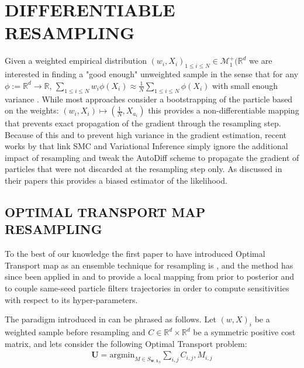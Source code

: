 \documentclass[]{article}
\begin{document}
\section{DIFFERENTIABLE RESAMPLING}
\label{sec:differentiable}
	Given a weighted empirical distribution $(w_i, X_i)_{1 \leq i \leq N} \in \mathcal{M}^+_1(\mathbb{R}^d$ we are interested in finding a "good enough" unweighted sample in the sense that for any $\phi := \mathbb{R}^d \to \mathbb{R}$, $\sum_{1 \leq i \leq N} w_i \phi(X_i) \approx \frac{1}{N}\sum_{1 \leq i \leq N} \phi(X_i)$ with small enough variance \parencite[][]{resampling_comp}. While most approaches consider a bootstrapping of the particle based on the weights: $(w_i, X_i) \mapsto (\frac 1 N, X_{a_i})$ this provides a non-differentiable mapping that prevents exact propagation of the gradient through the resampling step. Because of this and to prevent high variance in the gradient estimation, recent works by \cite{maddison2017filtering,naesseth2017variational,le2017auto} that link SMC and Variational Inference simply ignore the additional impact of resampling and tweak the AutoDiff scheme to propagate the gradient of particles that were not discarded at the resampling step only. As discussed in their papers this provides a biased estimator of the likelihood.
	
	\subsection{OPTIMAL TRANSPORT MAP RESAMPLING}
	\label{subsec:otResampling}
		To the best of our knowledge the first paper to have introduced Optimal Transport map as an ensemble technique for resampling is \cite{reich2012nonparametric}, and the method has since been applied in \cite{graham2019scalable} and \cite{jacob2016coupling} to provide a local mapping from prior to posterior and to couple same-seed particle filters trajectories in order to compute sensitivities with respect to its hyper-parameters. 
		
		The paradigm introduced in \cite{reich2012nonparametric} can be phrased as follows.
		Let $(w, X)_i$ be a weighted sample before resampling and $C \in \mathbb{R}^d \times \mathbb{R}^d$ be a symmetric positive cost matrix, and lets consider the following Optimal Transport problem: 
		\begin{align}
			\mathbf{U} = \text{argmin}_{M \in S_{\mathbf{w}, \mathbf{1}_N}} \sum_{i,j} C_{i,j}, M_{i,j} \label{eq:ot_res}
		\end{align}
		
\end{document}
